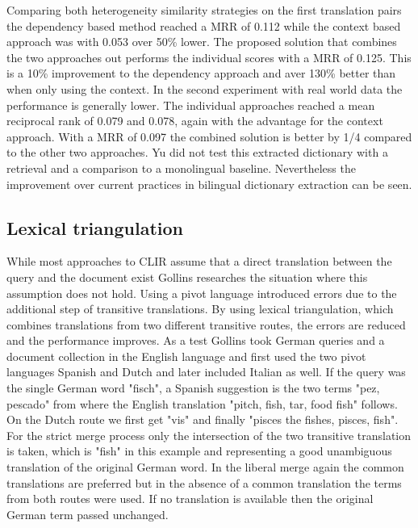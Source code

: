 \documentclass[journal]{IEEEtran}
\begin{document}
Comparing both heterogeneity similarity strategies on the first translation pairs the dependency based method reached a MRR of 0.112 while the context based approach was with 0.053 over 50\% lower.
The proposed solution that combines the two approaches out performs the individual scores with a MRR of 0.125.
This is a 10\% improvement to the dependency approach and aver 130\% better than when only using the context.
In the second experiment with real world data the performance is generally lower.
The individual approaches reached a mean reciprocal rank of 0.079 and 0.078, again with the advantage for the context approach.
With a MRR of 0.097 the combined solution is better by 1/4 compared to the other two approaches.
Yu did not test this extracted dictionary with a retrieval and a comparison to a monolingual baseline.
Nevertheless the improvement over current practices in bilingual dictionary extraction can be seen.

\subsection{Lexical triangulation}
While most approaches to CLIR assume that a direct translation between the query and the document exist Gollins \cite{gollins01} researches the situation where this assumption does not hold.
Using a pivot language introduced errors due to the additional step of transitive translations.
By using lexical triangulation, which combines translations from two different transitive routes, the errors are reduced and the performance improves.
As a test Gollins took German queries and a document collection in the English language and first used the two pivot languages Spanish and Dutch and later included Italian as well.
If the query was the single German word "fisch", a Spanish suggestion is the two terms "pez, pescado" from where the English translation "pitch, fish, tar, food fish" follows.
On the Dutch route we first get "vis" and finally "pisces the fishes, pisces, fish".
For the strict merge process only the intersection of the two transitive translation is taken, which is "fish" in this example and representing a good unambiguous translation of the original German word.
In the liberal merge again the common translations are preferred but in the absence of a common translation the terms from both routes were used.
If no translation is available then the original German term passed unchanged.
\end{document}
